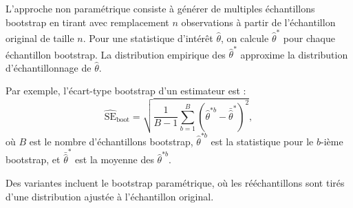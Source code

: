 L'approche non paramétrique consiste à générer de multiples échantillons bootstrap en tirant avec remplacement $n$ observations à partir de l'échantillon original de taille $n$. Pour une statistique d'intérêt $\hat{\theta}$, on calcule $\hat{\theta}^*$ pour chaque échantillon bootstrap. La distribution empirique des $\hat{\theta}^*$ approxime la distribution d'échantillonnage de $\hat{\theta}$.

Par exemple, l'écart-type bootstrap d'un estimateur est :
\begin{equation}
	\widehat{\mathrm{SE}}_{\mathrm{boot}} = \sqrt{\frac{1}{B-1} \sum_{b=1}^B (\hat{\theta}^{*b} - \bar{\hat{\theta}}^*)^2},
\end{equation}
où $B$ est le nombre d'échantillons bootstrap, $\hat{\theta}^{*b}$ est la statistique pour le $b$-ième bootstrap, et $\bar{\hat{\theta}}^*$ est la moyenne des $\hat{\theta}^{*b}$.

Des variantes incluent le bootstrap paramétrique, où les rééchantillons sont tirés d'une distribution ajustée à l'échantillon original.